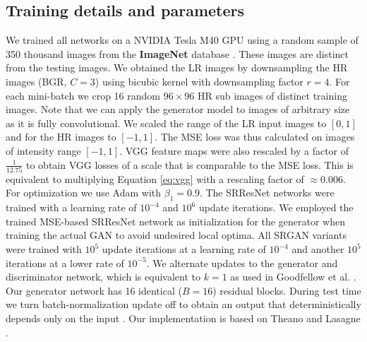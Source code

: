 \documentclass[10pt,twocolumn,letterpaper]{article}
\begin{document}
\subsection{Training details and parameters}
We trained all networks on a NVIDIA Tesla M40 GPU using a random sample of 350 thousand images from the \textbf{ImageNet} database \cite{russakovsky2014imagenet}. These images are distinct from the testing images. We obtained the \ac{LR} images by downsampling the \ac{HR} images (BGR, $C=3$) using bicubic kernel with downsampling factor $r=4$. For each mini-batch we crop 16 random $96\times96$ \ac{HR} sub images of distinct training images. Note that we can apply the generator model to images of arbitrary size as it is fully convolutional.
We scaled the range of the \ac{LR} input images to $[0, 1]$ and for the \ac{HR} images to $[-1, 1]$. The \ac{MSE} loss was thus calculated on images of intensity range $[-1, 1]$. VGG feature maps were also rescaled by a factor of $\frac{1}{12.75}$ to obtain VGG losses of a scale that is comparable to the \ac{MSE} loss. This is equivalent to multiplying Equation \ref{eq:vgg} with a rescaling factor of $\approx0.006$.
For optimization we use Adam \cite{Kingma2014} with $\beta_1=0.9$. The SRResNet networks were trained with a learning rate of $10^{-4}$ and $10^{6}$ update iterations. We employed the trained \ac{MSE}-based SRResNet network as initialization for the generator when training the actual \ac{GAN} to avoid undesired local optima.
All SRGAN variants were trained with $10^5$ update iterations at a learning rate of $10^{-4}$ and another $10^5$ iterations at a lower rate of $10^{-5}$.
 	We alternate updates to the generator and discriminator network, which is equivalent to $k=1$ as used in Goodfellow et al. \cite{Goodfellow14GAN}. Our generator network has 16 identical ($B=16$) residual blocks. During test time we turn batch-normalization update off to obtain an output that deterministically depends only on the input \cite{Ioffe2015}. Our implementation is based on Theano \cite{theano2016} and Lasagne \cite{lasagne2015}.
\end{document}
